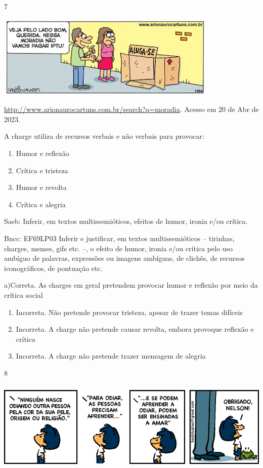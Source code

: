 {{\begin{escolha}
{\begin{itemize}
\begin{itemize}
\num{7}

\includegraphics[width=4.16667in,height=1.57292in]{./imgSAEB_7_POR/media/image17.png}

\href{http://www.arionaurocartuns.com.br/search?q=moradia}{\uline{http://www.arionaurocartuns.com.br/search?q=moradia}}.
Acesso em 20 de Abr de 2023.

A charge utiliza de recursos verbais e não verbais para provocar:

\begin{enumerate}
\def\labelenumi{\alph{enumi})}
\item
  Humor e reflexão
\item
  Crítica e tristeza
\item
  Humor e revolta
\item
  Crítica e alegria
\end{enumerate}

Saeb: Inferir, em textos multissemióticos, efeitos de humor, ironia e/ou
crítica.

Bncc: EF69LP03 Inferir e justificar, em textos multissemióticos --
tirinhas, charges, memes, gifs etc. --, o efeito de humor, ironia e/ou
crítica pelo uso ambíguo de palavras, expressões ou imagens ambíguas, de
clichês, de recursos iconográficos, de pontuação etc.

a)Correta. As charges em geral pretendem provocar humor e reflexão por
meio da crítica social

\begin{enumerate}
\def\labelenumi{\arabic{enumi}.}
\item
  Incorreta. Não pretende provocar tristeza, apesar de trazer temas
  difíceis
\item
  Incorreta. A charge não pretende causar revolta, embora provoque
  reflexão e crítica
\item
  Incorreta. A charge não pretende trazer mensagem de alegria
\end{enumerate}

\num{8}

\includegraphics[width=5.90551in,height=1.72222in]{./imgSAEB_7_POR/media/image18.png}


\end{itemize}
\end{itemize}}
\end{escolha}}}
